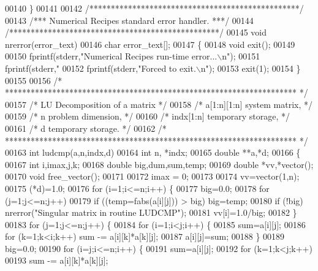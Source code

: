 \begin{DoxyCode}
00140 \}
00141 
00142 \textcolor{comment}{/*************************************************/}
00143 \textcolor{comment}{/*** Numerical Recipes standard error handler. ***/}
00144 \textcolor{comment}{/*************************************************/}
00145 \textcolor{keywordtype}{void} nrerror(error\_text)
00146 char error\_text[];
00147 \{
00148     \textcolor{keywordtype}{void} exit();
00149 
00150     fprintf(stderr,\textcolor{stringliteral}{"Numerical Recipes run-time error...\(\backslash\)n"});
00151     fprintf(stderr,\textcolor{stringliteral}{"%
00152     fprintf(stderr,\textcolor{stringliteral}{"Forced to exit.\(\backslash\)n"});
00153     exit(1);
00154 \}
00155 
00156 \textcolor{comment}{/* ******************************************************************** */}
00157 \textcolor{comment}{/* LU Decomposition of a matrix                     */}
00158 \textcolor{comment}{/*  a[1:n][1:n]     system matrix,              */}
00159 \textcolor{comment}{/*  n           problem dimension,          */}
00160 \textcolor{comment}{/*  indx[1:n]       temporary storage,          */}
00161 \textcolor{comment}{/*  d           temporary storage.          */}
00162 \textcolor{comment}{/* ******************************************************************** */}
00163 \textcolor{keywordtype}{int} ludcmp(a,n,indx,d)
00164 int n, *indx;
00165 \textcolor{keywordtype}{double} **a,*d;
00166 \{
00167     \textcolor{keywordtype}{int} i,imax,j,k;
00168     \textcolor{keywordtype}{double} big,dum,sum,temp;
00169     \textcolor{keywordtype}{double} *vv,*vector();
00170     \textcolor{keywordtype}{void} free_vector();
00171 
00172     imax = 0; 
00173 
00174     vv=vector(1,n);
00175     (*d)=1.0;
00176     \textcolor{keywordflow}{for} (i=1;i<=n;i++) \{
00177         big=0.0;
00178         \textcolor{keywordflow}{for} (j=1;j<=n;j++)
00179             \textcolor{keywordflow}{if} ((temp=fabs(a[i][j])) > big) big=temp;
00180         \textcolor{keywordflow}{if} (!big) nrerror(\textcolor{stringliteral}{"Singular matrix in routine LUDCMP"});
00181         vv[i]=1.0/big;
00182     \}
00183     \textcolor{keywordflow}{for} (j=1;j<=n;j++) \{
00184         \textcolor{keywordflow}{for} (i=1;i<j;i++) \{
00185             sum=a[i][j];
00186             \textcolor{keywordflow}{for} (k=1;k<i;k++) sum -= a[i][k]*a[k][j];
00187             a[i][j]=sum;
00188         \}
00189         big=0.0;
00190         \textcolor{keywordflow}{for} (i=j;i<=n;i++) \{
00191             sum=a[i][j];
00192             \textcolor{keywordflow}{for} (k=1;k<j;k++)
00193                 sum -= a[i][k]*a[k][j];
}
\end{DoxyCode}
